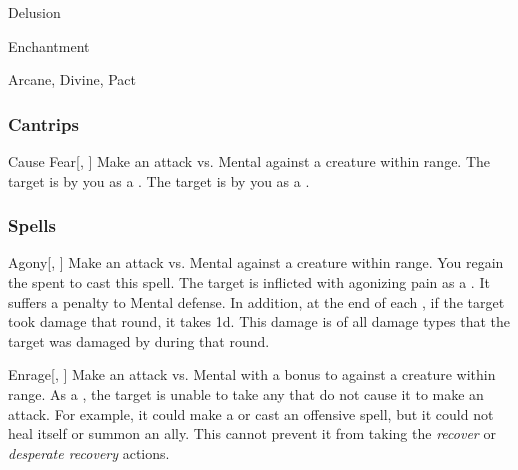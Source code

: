 \newpage
\begin{spellsection}{Delusion}

\begin{spellheader}
\end{spellheader}


 Enchantment

 Arcane, Divine, Pact

\subsubsection{Cantrips}


\begin{freeability}{Cause Fear}[, ]
Make an attack vs. Mental against a creature within \rngmed range.
\hit The target is  by you as a .
\crit The target is  by you as a .
\end{freeability}

\end{spellsection}


\subsubsection{Spells}


\lowercase{\hypertarget{spell:Agony}{}}\label{spell:Agony}
\begin{apability}[\nth{1}]{\hypertarget{spell:Agony}{Agony}}[, ]
Make an attack vs. Mental against a creature within \rngmed range.
\miss You regain the  spent to cast this spell.
\hit The target is inflicted with agonizing pain as a .
It suffers a  penalty to Mental defense.
In addition, at the end of each , if the target took damage that round, it takes  \minus1d.
This damage is of all damage types that the target was damaged by during that round.
\end{apability}
\vspace{0.25em}



\lowercase{\hypertarget{spell:Enrage}{}}\label{spell:Enrage}
\begin{apability}[\nth{1}]{\hypertarget{spell:Enrage}{Enrage}}[, ]
Make an attack vs. Mental with a  bonus to  against a creature within \rngmed range.
\hit As a , the target is unable to take any  that do not cause it to make an attack.
For example, it could make a  or cast an offensive spell, but it could not heal itself or summon an ally.
This cannot prevent it from taking the \textit{recover} or \textit{desperate recovery} actions.
\end{apability}
\vspace{0.25em}



